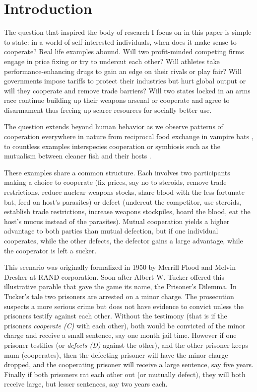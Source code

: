

\chapter{Introduction}
The question that inspired the body of research I focus on in this paper is simple to state: in a world of self-interested individuals, when does it make sense to cooperate?  Real life examples abound. Will two profit-minded competing firms engage in price fixing or try to undercut each other? Will athletes take performance-enhancing drugs to gain an edge on their rivals or play fair? Will governments impose tariffs to protect their industries but hurt global output or will they cooperate and remove trade barriers? Will two states locked in an arms race continue building up their weapons arsenal or cooperate and agree to disarmament thus freeing up scarce resources for socially better use.

The question extends beyond human behavior as we observe patterns of cooperation everywhere in nature from reciprocal food exchange in vampire bats \cite{Wilkinson_1984}, to countless examples interspecies cooperation or symbiosis such as the mutualism between cleaner fish and their hosts \cite{Bshary_2002}.

These examples share a common structure. Each involves two participants making a choice to cooperate (fix prices, say no to steroids, remove trade restrictions, reduce nuclear weapons stocks, share blood with the less fortunate bat, feed on host's parasites) or defect (undercut the competitor, use steroids, establish trade restrictions, increase weapons stockpiles, hoard the blood, eat the host's mucus instead of the parasites). Mutual cooperation yields a higher advantage to both parties than mutual defection, but if one individual cooperates, while the other defects, the defector gains a large advantage, while the cooperator is left a sucker.

This scenario was originally formalized in 1950 by Merrill Flood and Melvin Dresher at RAND corporation. Soon after Albert W. Tucker offered this illustrative parable that gave the game its name, the Prisoner's Dilemma. In Tucker's tale two prisoners are arrested on a minor charge. The prosecution suspects a more serious crime but does not have evidence to convict unless the prisoners testify against each other. Without the testimony (that is if the prisoners \textit{cooperate (C)} with each other), both would be convicted of the minor charge and receive a small sentence, say one month jail time. However if one prisoner testifies (or \textit{defects (D)} against the other), and the other prisoner keeps mum (cooperates), then the defecting prisoner will have the minor charge dropped, and the cooperating prisoner will receive a large sentence, say five years. Finally if both prisoners rat each other out (or mutually defect), they will both receive large, but lesser sentences, say two years each.


